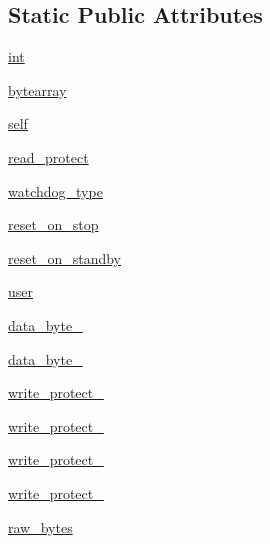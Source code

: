 \subsection*{Static Public Attributes}
\begin{DoxyCompactItemize}
\item 
\hyperlink{classstm__tools_1_1serialflasher_1_1devices_1_1OptionBytes_a61569f2965b7a369eb10b6d75d410d11}{int}
\item 
\hyperlink{classstm__tools_1_1serialflasher_1_1devices_1_1OptionBytes_a50d56d469cf437646fbb6d0c63ba7e9e}{bytearray}
\item 
\hyperlink{classstm__tools_1_1serialflasher_1_1devices_1_1OptionBytes_a9a04aa327fd016eb962c5799377e1f29}{self}
\item 
\hyperlink{classstm__tools_1_1serialflasher_1_1devices_1_1OptionBytes_a099b94c6be2822f849135ae50e806b73}{read\+\_\+protect}
\item 
\hyperlink{classstm__tools_1_1serialflasher_1_1devices_1_1OptionBytes_a352ca3d6460ffb8b4be71ca5b2b4a66a}{watchdog\+\_\+type}
\item 
\hyperlink{classstm__tools_1_1serialflasher_1_1devices_1_1OptionBytes_a563f83e9bb0cc532cb6c29efa34fc212}{reset\+\_\+on\+\_\+stop}
\item 
\hyperlink{classstm__tools_1_1serialflasher_1_1devices_1_1OptionBytes_af6b8cda6e2e17ec7cedeb961272d8f95}{reset\+\_\+on\+\_\+standby}
\item 
\hyperlink{classstm__tools_1_1serialflasher_1_1devices_1_1OptionBytes_a5cc32e366c87c4cb49e4309b75f57d64}{user}
\item 
\hyperlink{classstm__tools_1_1serialflasher_1_1devices_1_1OptionBytes_aa26ed87f84ce36929a443c5ca5ab883e}{data\+\_\+byte\+\_}
\item 
\hyperlink{classstm__tools_1_1serialflasher_1_1devices_1_1OptionBytes_a55f7b4672c91d43b12e6e6fa50ae0078}{data\+\_\+byte\+\_}
\item 
\hyperlink{classstm__tools_1_1serialflasher_1_1devices_1_1OptionBytes_aa6d5a8bc15ad2248eca0c8db3281bb10}{write\+\_\+protect\+\_}
\item 
\hyperlink{classstm__tools_1_1serialflasher_1_1devices_1_1OptionBytes_a8ff355caabcc05c7a12d63948443db25}{write\+\_\+protect\+\_}
\item 
\hyperlink{classstm__tools_1_1serialflasher_1_1devices_1_1OptionBytes_aec7190b83930f8f9e716ec1f07333eab}{write\+\_\+protect\+\_}
\item 
\hyperlink{classstm__tools_1_1serialflasher_1_1devices_1_1OptionBytes_a728da06e5068901f3524fe02a873e514}{write\+\_\+protect\+\_}
\item 
\hyperlink{classstm__tools_1_1serialflasher_1_1devices_1_1OptionBytes_a55a904d43455b0d4484caa720e744a83}{raw\+\_\+bytes}
\end{DoxyCompactItemize}



